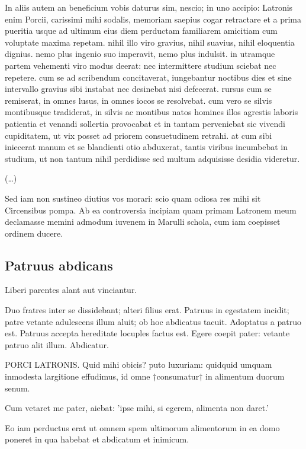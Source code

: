 In aliis autem an beneficium vobis daturus sim, nescio; in uno accipio: Latronis enim Porcii, carissimi mihi sodalis, memoriam saepius cogar retractare et a prima pueritia usque ad ultimum eius diem perductam familiarem amicitiam cum voluptate maxima repetam. nihil illo viro gravius, nihil suavius, nihil eloquentia dignius. nemo plus ingenio suo imperavit, nemo plus indulsit. in utramque partem vehementi viro modus deerat: nec intermittere studium sciebat nec repetere. cum se ad scribendum concitaverat, iungebantur noctibus dies et sine intervallo gravius sibi instabat nec desinebat nisi defecerat. rursus cum se remiserat, in omnes lusus, in omnes iocos se resolvebat. cum vero se silvis montibusque tradiderat, in silvis ac montibus natos homines illos agrestis laboris patientia et venandi sollertia provocabat et in tantam perveniebat sic vivendi cupiditatem, ut vix posset ad priorem consuetudinem retrahi. at cum sibi iniecerat manum et se blandienti otio abduxerat, tantis viribus incumbebat in studium, ut non tantum nihil perdidisse sed multum adquisisse desidia videretur. 

(\dots)

Sed iam non sustineo diutius vos morari: scio quam odiosa res mihi sit Circensibus pompa. Ab ea controversia incipiam quam primam Latronem meum declamasse memini admodum iuvenem in Marulli schola, cum iam coepisset ordinem ducere. 

\subsection*{Patruus abdicans}

Liberi parentes alant aut vinciantur.

\bigskip

Duo fratres inter se dissidebant; alteri filius erat. Patruus in egestatem incidit; patre vetante adulescens illum aluit; ob hoc abdicatus tacuit. Adoptatus a patruo est. Patruus accepta hereditate locuples factus est. Egere coepit pater: vetante patruo alit illum. Abdicatur. 	

\bigskip

PORCI LATRONIS. Quid mihi obicis? puto luxuriam: quidquid umquam inmodesta largitione effudimus, id omne †consumatur† in alimentum duorum senum. 

Cum vetaret me pater, aiebat: 'ipse mihi, si egerem, alimenta non daret.' 

Eo iam perductus erat ut omnem spem ultimorum alimentorum in ea domo poneret in qua habebat et abdicatum et inimicum. 

